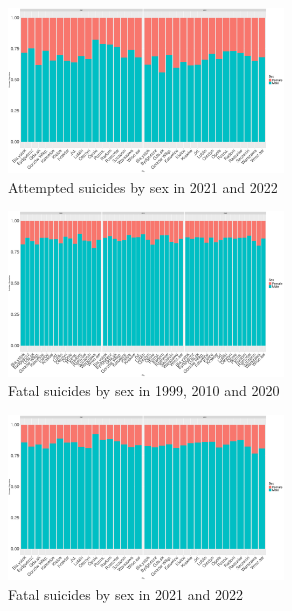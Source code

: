\documentclass{article}
\begin{document}
\begin{figure}[H]
    \centering
    \includegraphics[width=0.65\textwidth]{imgs/sex_city_att_suicides-2122.pdf}
    \caption{Attempted suicides by sex  in 2021 and 2022}
    \label{fig:sex_city_att_suicides-2122}
\end{figure}

\begin{figure}[H]
    \centering
    \includegraphics[width=0.65\textwidth]{imgs/sex_city_fat_suicides-991020.pdf}
    \caption{Fatal suicides by sex  in 1999, 2010 and 2020}
    \label{fig:sex_city_fat_suicides-991020}
\end{figure}

\begin{figure}[H]
    \centering
    \includegraphics[width=0.65\textwidth]{imgs/sex_city_fat_suicides-2122.pdf}
    \caption{Fatal suicides by sex  in 2021 and 2022}
    \label{fig:sex_city_fat_suicides-2122}
\end{figure}
\end{document}
